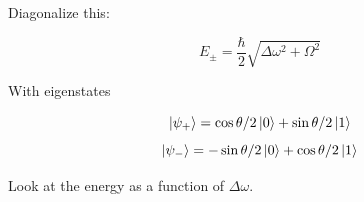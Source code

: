 \documentclass{article}
\newtheorem{one minute paper}[theorem]{One Minute Paper}
\begin{document}
Diagonalize this: 

\begin{equation}
    E_{\pm} = \frac{\hbar}{2}\sqrt{\Delta \omega^2 + \Omega^2}
\end{equation}

With eigenstates 

\begin{equation}
    \ket{\psi_{+}} = \cos\theta/2 \ket{0} + \sin\theta/2\ket{1}
\end{equation}
\begin{equation}
    \ket{\psi_{-}} = -\sin\theta/2 \ket{0} + \cos\theta/2\ket{1}
\end{equation}

Look at the energy as a function of $\Delta \omega$. 
\end{document}
